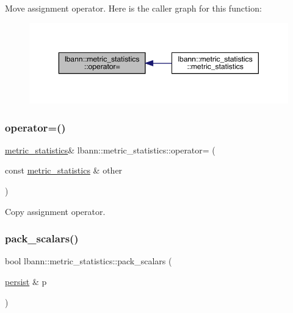 Move assignment operator. Here is the caller graph for this function\+:\nopagebreak
\begin{figure}[H]
\begin{center}
\leavevmode
\includegraphics[width=350pt]{structlbann_1_1metric__statistics_a4d9ae608667c58eda58be3f4a237122d_icgraph}
\end{center}
\end{figure}
\mbox{\label{structlbann_1_1metric__statistics_abdd86ced3ca40a411ebc1db2b857653b}} 
\subsubsection{\texorpdfstring{operator=()}{operator=()}\hspace{0.1cm}{\footnotesize\ttfamily [2/2]}}
{\footnotesize\ttfamily \hyperlink{structlbann_1_1metric__statistics}{metric\+\_\+statistics}\& lbann\+::metric\+\_\+statistics\+::operator= (\begin{DoxyParamCaption}\item[{const \hyperlink{structlbann_1_1metric__statistics}{metric\+\_\+statistics} \&}]{other }\end{DoxyParamCaption})\hspace{0.3cm}{\ttfamily [default]}}

Copy assignment operator. \mbox{\label{structlbann_1_1metric__statistics_a88f5324c96cceb47d723d2acfddb41f1}} 
\subsubsection{\texorpdfstring{pack\+\_\+scalars()}{pack\_scalars()}}
{\footnotesize\ttfamily bool lbann\+::metric\+\_\+statistics\+::pack\+\_\+scalars (\begin{DoxyParamCaption}\item[{\hyperlink{classlbann_1_1persist}{persist} \&}]{p }\end{DoxyParamCaption})}



